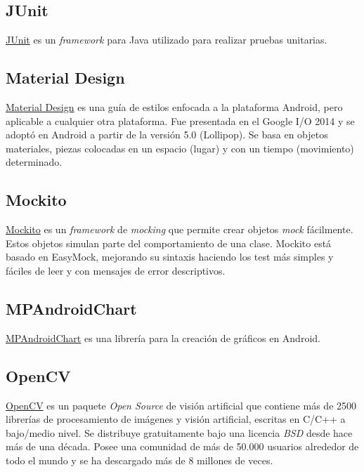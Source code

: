 \subsection{JUnit}\label{junit}

\href{http://junit.org/junit4/}{JUnit} es un \emph{framework} para Java
utilizado para realizar pruebas unitarias.

\subsection{Material Design}\label{material-design}

\href{https://material.io/guidelines/}{Material Design} es una guía de
estilos enfocada a la plataforma Android, pero aplicable a cualquier
otra plataforma. Fue presentada en el Google I/O 2014 y se adoptó en
Android a partir de la versión 5.0 (Lollipop). Se basa en objetos
materiales, piezas colocadas en un espacio (lugar) y con un tiempo
(movimiento) determinado.

\subsection{Mockito}\label{mockito}

\href{http://mockito.org/}{Mockito} es un \emph{framework} de
\emph{mocking} que permite crear objetos \emph{mock} fácilmente. Estos
objetos simulan parte del comportamiento de una clase. Mockito está
basado en EasyMock, mejorando su sintaxis haciendo los test más simples
y fáciles de leer y con mensajes de error descriptivos.

\subsection{MPAndroidChart}\label{mpandroidchart}

\href{https://github.com/PhilJay/MPAndroidChart}{MPAndroidChart} es una
librería para la creación de gráficos en Android.

\subsection{OpenCV}\label{opencv}

\href{www.opencv.org}{OpenCV} es un paquete \emph{Open Source} de visión
artificial que contiene más de 2500 librerías de procesamiento de
imágenes y visión artificial, escritas en C/C++ a bajo/medio nivel. Se
distribuye gratuitamente bajo una licencia \emph{BSD} desde hace más de
una década. Posee una comunidad de más de 50.000 usuarios alrededor de
todo el mundo y se ha descargado más de 8 millones de veces.

